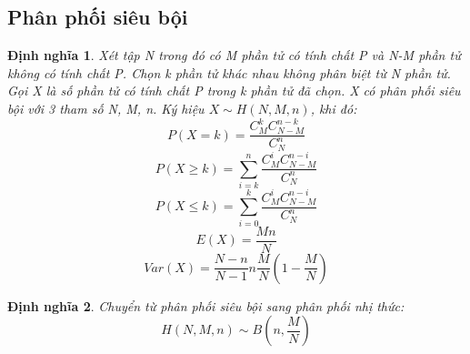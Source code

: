 \documentclass[12pt]{article}
\newtheorem{thm}{Định nghĩa}
\begin{document}
\subsection{Phân phối siêu bội}
\begin{thm}
    Xét tập N trong đó có M phần tử có tính chất P và N-M phần tử không có tính chất P. 
    Chọn k phần tử khác nhau không phân biệt từ N phần tử. 
    Gọi X là số phần tử có tính chất P trong k phần tử đã chọn. 
    X có phân phối siêu bội với 3 tham số N, M, n. 
    Ký hiệu $X \sim H(N, M, n)$, khi đó:
    \begin{equation}
        P(X = k) = \frac{C_M^k C_{N-M}^{n-k}}{C_N^n}
    \end{equation}
    \begin{equation}
        P(X \geq k) = \sum_{i=k}^n \frac{C_M^i C_{N-M}^{n-i}}{C_N^n}
    \end{equation}
    \begin{equation}
        P(X \leq k) = \sum_{i=0}^k \frac{C_M^i C_{N-M}^{n-i}}{C_N^n}
    \end{equation}
    \begin{equation}
        E(X) = \frac{Mn}{N}
    \end{equation}
    \begin{equation}
        Var(X) = \frac{N-n}{N-1}n\frac{M}{N}(1 - \frac{M}{N})
    \end{equation}
\end{thm}
\begin{thm}
    Chuyển từ phân phối siêu bội sang phân phối nhị thức:
    \begin{equation}
    H(N, M, n) \sim B(n, \frac{M}{N})
    \end{equation}
\end{thm}
\end{document}
